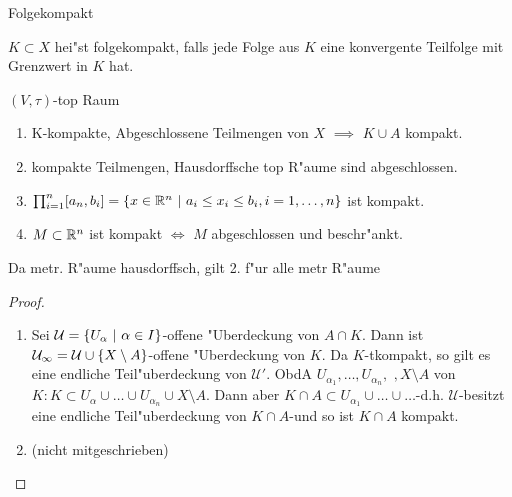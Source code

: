 \documentclass[class=article, crop=false]{standalone}
\begin{document}
\begin{zettel}{Folgekompakt}
\begin{flashcard}
    \begin{definition}[folgekompakt]
        $K \subset  X$ hei"st folgekompakt, falls jede Folge aus $K$ eine konvergente Teilfolge mit Grenzwert in $K$ hat.
    \end{definition}
    \begin{theorem}
    $(V,\tau)$-top Raum
    \begin{enumerate}
        \item K-kompakte, Abgeschlossene Teilmengen von $X$ $\implies $ $K \cup A$ kompakt. 
        \item kompakte Teilmengen, Hausdorffsche top R"aume sind abgeschlossen.
    \item $\prod_{i=1}^n [a_n,b_i] = \set{x \in  \R ^{n}}{ a_i \leq x_i \leq  b_i, i=1,\dots,n}$ ist kompakt.
    \item $M \subset  \mathbb{R} ^n$ ist kompakt $\iff $ $M$ abgeschlossen und beschr"ankt.
    \end{enumerate}
    \end{theorem}

    \begin{remark}
    Da metr. R"aume hausdorffsch, gilt 2. f"ur alle metr R"aume
    \end{remark}
    \begin{proof}
        \begin{enumerate}
            \item Sei $\mathcal{U} = \set{U_{\alpha}}{\alpha \in  I}$-offene "Uberdeckung von $A \cap K$. Dann ist $\mathcal{U_{1}}= \mathcal{U}\cup \set{X \setminus  A}$-offene "Uberdeckung von $K$. Da $K$-tkompakt, so gilt es eine endliche Teil"uberdeckung von $\mathcal{U}'$. ObdA $U_{\alpha_1}, \dots, U_{\alpha_n}, $  $,X \setminus A$ von $K: K \subset  U_{\alpha} \cup \dots \cup U_{\alpha_{n}} \cup X \setminus A$. Dann aber $K \cap  A \subset U_{\alpha_{1}} \cup  \dots \cup \dots$-d.h. $\mathcal{U}$-besitzt eine endliche Teil"uberdeckung von $K \cap  A$-und so ist $K \cap  A $ kompakt.
            \item (nicht mitgeschrieben)
        \end{enumerate}
    \end{proof}

\end{flashcard}
\end{zettel}
\end{document}

